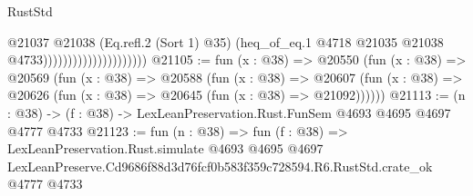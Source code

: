\begin{lexlean}{RustStd}
\begin{coremodule}
                                          @21037
                                            @21038
                                            (Eq.refl.{2} (Sort 1) @35)
                                            (heq_of_eq.{1}
                                              @4718
                                              @21035
                                              @21038
                                              @4733)))))))))))))))))))))
@21105 := fun (x : @38) =>
  @20550
    (fun (x : @38) =>
    @20569
      (fun (x : @38) =>
      @20588
        (fun (x : @38) =>
        @20607 (fun (x : @38) => @20626 (fun (x : @38) => @20645 (fun (x : @38) => @21092))))))
@21113 := (n : @38) -> (f : @38) -> LexLeanPreservation.Rust.FunSem @4693 @4695 @4697 @4777 @4733
@21123 := fun (n : @38) =>
  fun (f : @38) =>
  LexLeanPreservation.Rust.simulate
    @4693
    @4695
    @4697
    LexLeanPreserve.Cd9686f88d3d76fcf0b583f359c728594.R6.RustStd.crate_ok
    @4777
    @4733
\end{coremodule}
\end{lexlean}
